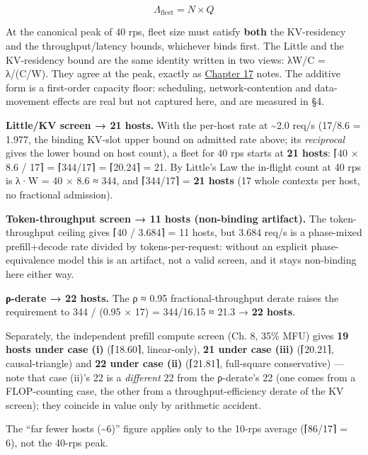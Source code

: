 \[
\Lambda_\text{fleet} = N \times Q
\]

At the canonical peak of 40 rps, fleet size must satisfy \textbf{both}
the KV-residency and the throughput/latency bounds, whichever binds
first. The Little and the KV-residency bound are the same identity
written in two views: λW/C = λ/(C/W). They agree at the peak, exactly as
\hyperref[chap:17]{Chapter 17} notes. The additive form is a first-order capacity floor:
scheduling, network-contention and data-movement effects are real but
not captured here, and are measured in §4.

\textbf{Little/KV screen → 21 hosts.} With the per-host rate at
\textasciitilde2.0 req/s (17/8.6 = 1.977, the binding KV-slot upper
bound on admitted rate above; its \emph{reciprocal} gives the lower
bound on host count), a fleet for 40 rps starts at \textbf{21 hosts}:
⌈40 × 8.6 / 17⌉ = ⌈344/17⌉ = ⌈20.24⌉ = 21. By Little's Law the in-flight
count at 40 rps is λ·W = 40 × 8.6 ≈ 344, and ⌈344/17⌉ = \textbf{21
hosts} (17 whole contexts per host, no fractional admission).

\textbf{Token-throughput screen → 11 hosts (non-binding artifact).} The
token-throughput ceiling gives ⌈40 / 3.684⌉ = 11 hosts, but 3.684 req/s
is a phase-mixed prefill+decode rate divided by tokens-per-request:
without an explicit phase-equivalence model this is an artifact, not a
valid screen, and it stays non-binding here either way.

\textbf{ρ-derate → 22 hosts.} The ρ ≈ 0.95 fractional-throughput derate
raises the requirement to 344 / (0.95 × 17) = 344/16.15 ≈ 21.3 →
\textbf{22 hosts}.

Separately, the independent prefill compute screen (Ch. 8, 35\% MFU)
gives \textbf{19 hosts under case (i)} (⌈18.60⌉, linear-only),
\textbf{21 under case (iii)} (⌈20.21⌉, causal-triangle) and \textbf{22
under case (ii)} (⌈21.81⌉, full-square conservative) --- note that case
(ii)'s 22 is a \emph{different} 22 from the ρ-derate's 22 (one comes
from a FLOP-counting case, the other from a throughput-efficiency derate
of the KV screen); they coincide in value only by arithmetic accident.

The ``far fewer hosts (\textasciitilde6)'' figure applies only to the
10-rps average (⌈86/17⌉ = 6), not the 40-rps peak.

